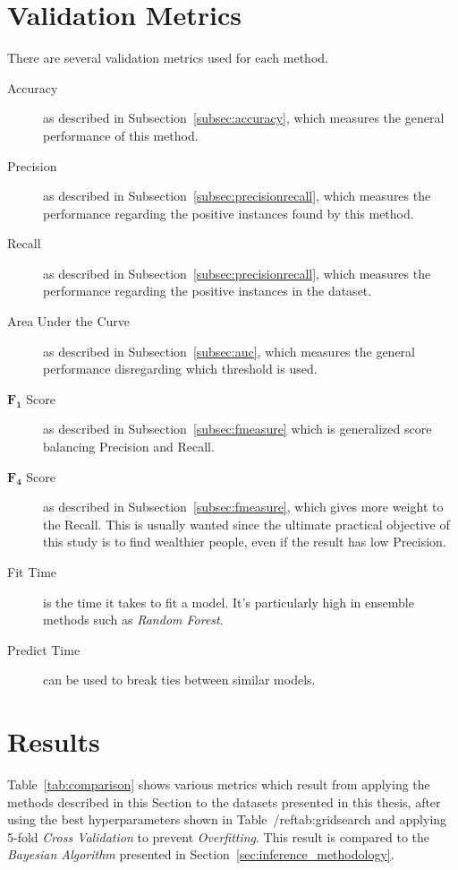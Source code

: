 \section{Validation Metrics}
\label{subsec:validationmetrics}
There are several validation metrics used for each method.

\begin{description}
	\item[Accuracy] as described in Subsection~\ref{subsec:accuracy}, which measures the general performance of this method.
	\item[Precision] as described in Subsection~\ref{subsec:precisionrecall}, which measures the performance regarding the positive instances found by this method.
	\item[Recall] as described in Subsection~\ref{subsec:precisionrecall}, which measures the performance regarding the positive instances in the dataset.
	\item[Area Under the Curve] as described in Subsection~\ref{subsec:auc}, which measures the general performance disregarding which threshold is used.
	\item[$\mathbf{F_1}$ Score] as described in Subsection~\ref{subsec:fmeasure} which is generalized score balancing Precision and Recall.
	\item[$\mathbf{F_4}$ Score] as described in Subsection~\ref{subsec:fmeasure}, which gives more weight to the Recall. This is usually wanted since the ultimate practical objective of this study is to find wealthier people, even if the result has low Precision.
	\item[Fit Time] is the time it takes to fit a model. It's particularly high in ensemble methods such as \emph{Random Forest}.
	\item[Predict Time] can be used to break ties between similar models.
\end{description}

\section{Results}

Table~\ref{tab:comparison} shows various metrics which result from applying the methods described in this Section to the datasets presented in this thesis, after using the best hyperparameters shown in Table~/ref{tab:gridsearch} and applying 5-fold \emph{Cross Validation} to prevent \emph{Overfitting}. This result is compared to the \emph{Bayesian Algorithm} presented in Section~\ref{sec:inference_methodology}.

